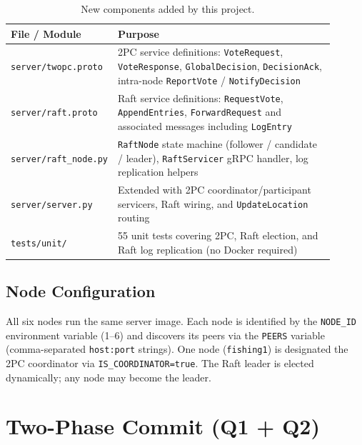 \documentclass[11pt]{article}
\newcommand{\rpc}[1]{\texttt{#1}}
\begin{document}
\renewcommand{\arraystretch}{1.12}
\begin{table}[H]
\centering
\caption{New components added by this project.}
\label{tab:components}
\begin{tabular}{p{0.22\linewidth} p{0.68\linewidth}}
\toprule
\textbf{File / Module} & \textbf{Purpose} \\
\midrule
\texttt{server/twopc.proto}          & 2PC service definitions: \rpc{VoteRequest}, \rpc{VoteResponse}, \rpc{GlobalDecision}, \rpc{DecisionAck}, intra-node \rpc{ReportVote} / \rpc{NotifyDecision} \\
\texttt{server/raft.proto}           & Raft service definitions: \rpc{RequestVote}, \rpc{AppendEntries}, \rpc{ForwardRequest} and associated messages including \texttt{LogEntry} \\
\texttt{server/raft\_node.py}        & \texttt{RaftNode} state machine (follower / candidate / leader), \texttt{RaftServicer} gRPC handler, log replication helpers \\
\texttt{server/server.py}            & Extended with 2PC coordinator/participant servicers, Raft wiring, and \rpc{UpdateLocation} routing \\
\texttt{tests/unit/}                 & 55 unit tests covering 2PC, Raft election, and Raft log replication (no Docker required) \\
\bottomrule
\end{tabular}
\end{table}
\renewcommand{\arraystretch}{1.0}

\subsection{Node Configuration}

All six nodes run the same server image.
Each node is identified by the \texttt{NODE\_ID} environment variable (1--6) and discovers
its peers via the \texttt{PEERS} variable (comma-separated \texttt{host:port} strings).
One node (\texttt{fishing1}) is designated the 2PC coordinator via \texttt{IS\_COORDINATOR=true}.
The Raft leader is elected dynamically; any node may become the leader.

\section{Two-Phase Commit (Q1 + Q2)}
\end{document}

